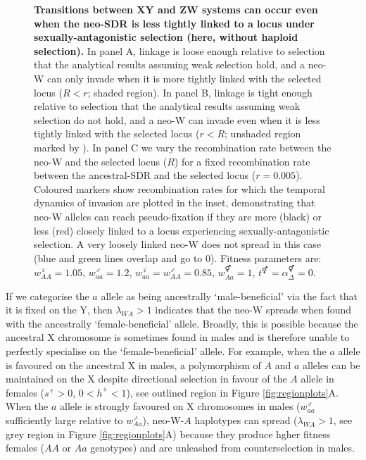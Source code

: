 \documentclass[10pt,letterpaper]{article}
\begin{document}
\begin{figure}[!h]
\centering
\caption{
{\bf Transitions between XY and ZW systems can occur even when the neo-SDR is less tightly linked to a locus under sexually-antagonistic selection (here, without haploid selection).}
In panel A, linkage is loose enough relative to selection that the analytical results assuming weak selection hold, and a neo-W can only invade when it is more tightly linked with the selected locus ($R<r$; shaded region).
In panel B, linkage is tight enough relative to selection that the analytical results assuming weak selection do not hold, and a neo-W can invade even when it is less tightly linked with the selected locus ($r<R$; unshaded region marked by \text{*}).
In panel C we vary the recombination rate between the neo-W and the selected locus ($R$) for a fixed recombination rate between the ancestral-SDR and the selected locus ($r=0.005$). 
Coloured markers show recombination rates for which the temporal dynamics of invasion are plotted in the inset, demonstrating that neo-W alleles can reach pseudo-fixation if they are more (black) or less (red) closely linked to a locus experiencing sexually-antagonistic selection. 
A very loosely linked neo-W does not spread in this case (blue and green lines overlap and go to 0). 
Fitness parameters are: $w_{AA}^\female = 1.05$, $w_{aa}^\male = 1.2$, $w_{aa}^\female = w_{AA}^\male = 0.85$, $w_{Aa}^\Hermaphrodite = 1$,  $t^\Hermaphrodite = \alpha^\Hermaphrodite_\Delta = 0$.
}
\label{fig:SexAntagTighter}
\end{figure}

If we categorise the $a$ allele as being ancestrally `male-beneficial' via the fact that it is fixed on the Y, then $\lambda_{WA}>1$ indicates that the neo-W spreads when found with the ancestrally `female-beneficial' allele. 
Broadly, this is possible because the ancestral X chromosome is sometimes found in males and is therefore unable to perfectly specialise on the `female-beneficial' allele. 
For example, when the $a$ allele is favoured on the ancestral X in males, a polymorphism of $A$ and $a$ alleles can be maintained on the X despite directional selection in favour of the $A$ allele in females ($s^\female>0$, $0<h^\female<1$), see outlined region in Figure \ref{fig:regionplots}A. 
When the $a$ allele is strongly favoured on X chromosomes in males ($w_{aa}^\male$ sufficiently large relative to $w_{Aa}^\male$), neo-W-$A$ haplotypes can spread ($\lambda_{WA}>1$, see grey region in Figure \ref{fig:regionplots}A) because they produce hgher fitness females ($AA$ or $Aa$ genotypes) and are unleashed from counterselection in males. 
\end{document}
